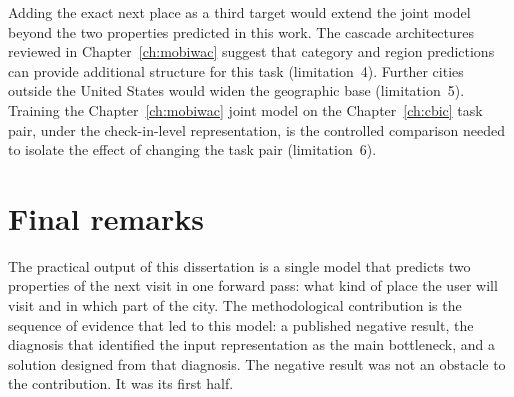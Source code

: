 Adding the exact next place as a third target would extend the joint model beyond the
two properties predicted in this work. The cascade architectures reviewed in
Chapter~\ref{ch:mobiwac} suggest that category and region predictions can provide
additional structure for this task (limitation~4).
Further cities outside the United States would widen the geographic base
(limitation~5). Training the Chapter~\ref{ch:mobiwac} joint model on the
Chapter~\ref{ch:cbic} task pair, under the check-in-level representation, is the
controlled comparison needed to isolate the effect of changing the task pair
(limitation~6).


\section{Final remarks}
\label{sec:conc:final}

The practical output of this dissertation is a single model that predicts two
properties of the next visit in one forward pass: what kind of place the user will
visit and in which part of the city. The methodological contribution is the sequence
of evidence that led to this model: a published negative result, the diagnosis that
identified the input representation as the main bottleneck, and a solution designed
from that diagnosis. The negative result was not an obstacle to the contribution. It
was its first half.
